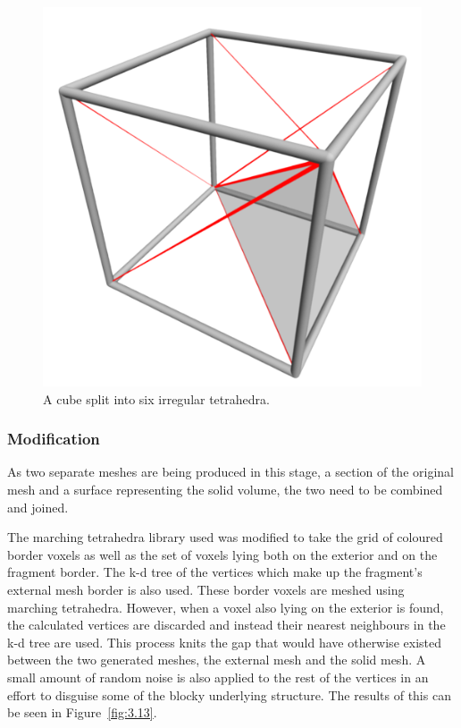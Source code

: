 \begin{figure}[b!]
\centerline{\includegraphics[scale=0.8]{Marching_tetrahedrons.png}}
\caption{A cube split into six irregular tetrahedra\cite{marchingpict}.}
\label{fig:3.12}
\end{figure}

\clearpage
\subsubsection{Modification}

As two separate meshes are being produced in this stage, a section of the original mesh and a surface representing the solid volume, the two need to be combined and joined.

The marching tetrahedra library used was modified to take the grid of coloured border voxels as well as the set of voxels lying both on the exterior and on the fragment border. The k-d tree of the vertices which make up the fragment's external mesh border is also used. These border voxels are meshed using marching tetrahedra. However, when a voxel also lying on the exterior is found, the calculated vertices are discarded and instead their nearest neighbours in the k-d tree are used. This process knits the gap that would have otherwise existed between the two generated meshes, the external mesh and the solid mesh. A small amount of random noise is also applied to the rest of the vertices in an effort to disguise some of the blocky underlying structure. The results of this can be seen in Figure~\ref{fig:3.13}.

